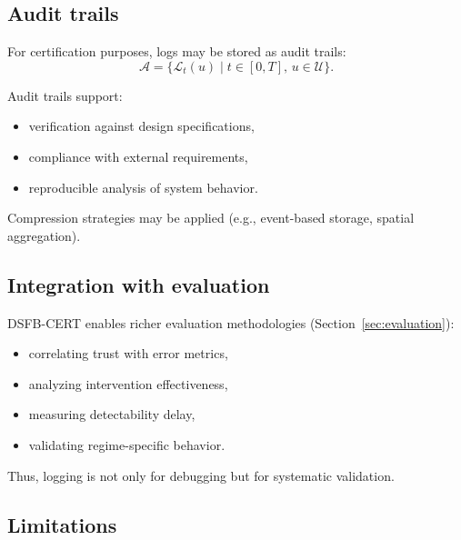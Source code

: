 \documentclass[11pt,letterpaper]{article}
\theoremstyle{gcresult}
\theoremstyle{definition}
\begin{document}

\subsection{Audit trails}

For certification purposes, logs may be stored as audit trails:
\begin{equation}
\mathcal{A} = \{\mathcal{L}_t(u) \mid t\in[0,T],\,u\in\mathcal{U}\}.
\end{equation}

Audit trails support:
\begin{itemize}[leftmargin=1.5em]
    \item verification against design specifications,
    \item compliance with external requirements,
    \item reproducible analysis of system behavior.
\end{itemize}

Compression strategies may be applied (e.g., event-based storage, spatial aggregation).


\subsection{Integration with evaluation}

DSFB-CERT enables richer evaluation methodologies (Section~\ref{sec:evaluation}):
\begin{itemize}[leftmargin=1.5em]
    \item correlating trust with error metrics,
    \item analyzing intervention effectiveness,
    \item measuring detectability delay,
    \item validating regime-specific behavior.
\end{itemize}

Thus, logging is not only for debugging but for systematic validation.


\subsection{Limitations}
\end{document}
